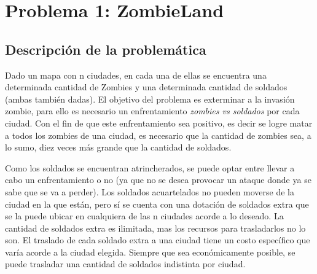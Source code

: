\documentclass[a4paper]{article}
\begin{document}
\thispagestyle{empty}


\maketitle
\newpage

\thispagestyle{empty}
\vfill
\begin{abstract}
Habi\'endonos sido dado una serie de tres problem\'aticas a resolver, se plantean sus respectivas soluciones acorde a los requisitos pedidos. Se adjunta una descripci\'on de cada problema y su soluci\'on, conjunto a su an\'alisis de correctitud y de complejidad sumado a su experimentaci\'on. El lenguaje elegido para llevar a cabo el trabajo es C++.
\end{abstract}

\thispagestyle{empty}
\vspace{3cm}
\tableofcontents
\newpage


\newpage

\section{Problema 1: ZombieLand}

\subsection{Descripci\'on de la problem\'atica}

Dado un mapa con n ciudades, en cada una de ellas se encuentra una determinada cantidad de Zombies y una determinada cantidad de soldados (ambas tambi\'en dadas). El objetivo del problema es exterminar a la invasi\'on zombie, para ello es necesario un enfrentamiento \textit{zombies vs soldados} por cada ciudad. Con el fin de que este enfrentamiento sea positivo, es decir se logre matar a todos los zombies de una ciudad, es necesario que la cantidad de zombies sea, a lo sumo, diez veces m\'as grande que la cantidad de soldados.

Como los soldados se encuentran atrincherados, se puede optar entre llevar a cabo un enfrentamiento o no (ya que no se desea provocar un ataque donde ya se sabe que se va a perder). Los soldados acuartelados no pueden moverse de la ciudad en la que est\'an, pero s\'i se cuenta con una dotaci\'on de soldados extra que se la puede ubicar en cualquiera de las n ciudades acorde a lo deseado. La cantidad de soldados extra es ilimitada, mas los recursos para trasladarlos no lo son. El traslado de cada soldado extra a una ciudad tiene un costo espec\'ifico que var\'ia acorde a la ciudad elegida. Siempre que sea econ\'omicamente posible, se puede trasladar una cantidad de soldados indistinta por ciudad.
\end{document}
